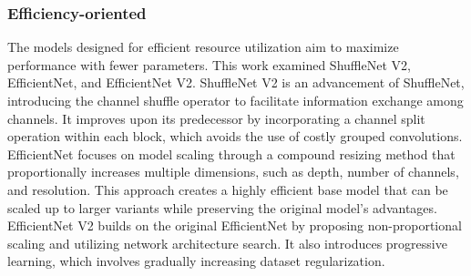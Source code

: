 





\FloatBarrier

\subsubsection{Efficiency-oriented}

The models designed for efficient resource utilization aim to maximize performance with fewer parameters. This work examined ShuffleNet V2, EfficientNet, and EfficientNet V2. ShuffleNet V2 is an advancement of ShuffleNet, introducing the channel shuffle operator to facilitate information exchange among channels. It improves upon its predecessor by incorporating a channel split operation within each block, which avoids the use of costly grouped convolutions. EfficientNet focuses on model scaling through a compound resizing method that proportionally increases multiple dimensions, such as depth, number of channels, and resolution. This approach creates a highly efficient base model that can be scaled up to larger variants while preserving the original model's advantages. EfficientNet V2 builds on the original EfficientNet by proposing non-proportional scaling and utilizing network architecture search. It also introduces progressive learning, which involves gradually increasing dataset regularization. 

